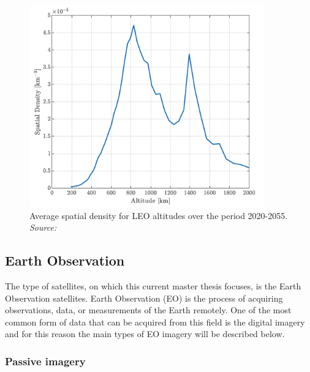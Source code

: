 \begin{figure}
\centering
\includegraphics[width=0.9\textwidth]{Images/crisp2.png}\caption{Average spatial density for LEO altitudes over the period 2020-2055. \textit{Source: \cite{Crisp 2020}}}
\label{crisp2} 
\end{figure}

\bigskip
\subsection{Earth Observation}
\label{EO}
\bigskip

The type of satellites, on which this current master thesis focuses, is the Earth Observation satellites. Earth Observation (EO) is the process of acquiring observations, data, or measurements of the Earth remotely. One of the most common form of data that can be acquired from this field is the digital imagery and for this reason the main types of EO imagery will be described below. \cite{ESA EO}

\bigskip
\subsubsection{Passive imagery}
\bigskip

